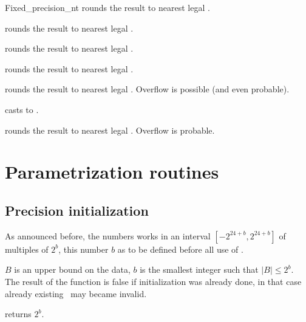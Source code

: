 \begin{ccClass} {Fixed_precision_nt}
       {rounds the result to nearest legal .}

       {rounds the result to nearest legal .}

       {rounds the result to nearest legal .}

       {rounds the result to nearest legal .}

       {rounds the result to nearest legal . Overflow is possible (and even probable).}

         {casts to .}


       {rounds the result to nearest legal . Overflow is probable.}



\section{Parametrization routines}

\subsection{Precision initialization}
As announced before, the  numbers works in an
interval $[-2^{24+b},2^{24+b}]$ of multiples of $2^b$,
this number $b$ as to be defined before all use of .


{$B$ is an upper bound on the data, $b$ is the smallest integer such that 
$|B|\leq 2^b$. The result of the function is false if initialization was
already done, in that case already existing \ccClassName\ may became invalid.}

{returns $2^b$.}


\end{ccClass}
